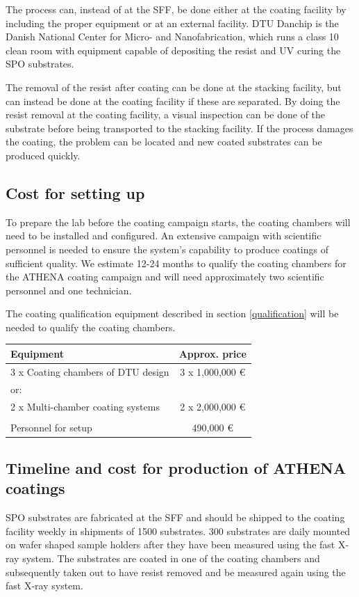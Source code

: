 The process can, instead of at the SFF, be done either at the coating facility by including the proper equipment or at an external facility. DTU Danchip is the Danish National Center for Micro- and Nanofabrication, which runs a class 10 clean room with equipment capable of depositing the resist and UV curing the SPO substrates.

The removal of the resist after coating can be done at the stacking facility, but can instead be done at the coating facility if these are separated. By doing the resist removal at the coating facility, a visual inspection can be done of the substrate before being transported to the stacking facility. If the process damages the coating, the problem can be located and new coated substrates can be produced quickly.


\subsection{Cost for setting up}
To prepare the lab before the coating campaign starts, the coating chambers will need to be installed and configured. An extensive campaign with scientific personnel is needed to ensure the system's capability to produce coatings of sufficient quality. We estimate 12-24 months to qualify the coating chambers for the ATHENA coating campaign and will need approximately two scientific personnel and one technician.

The coating qualification equipment described in section \ref{qualification} will be needed to qualify the coating chambers.


\begin{table}[htbp]
	\centering
\begin{tabular}{l|c}
Equipment & Approx. price \\
\hline
\hline
3 x Coating chambers of DTU design  & 3 x 1,000,000 \euro\\
\hline
or:\\
\hline
2 x Multi-chamber coating systems & 2 x 2,000,000 \euro \\
\hline
\\
\hline
Personnel for setup & 490,000 \euro\\
\end{tabular}
\end{table}


\subsection{Timeline and cost for production of ATHENA coatings}
SPO substrates are fabricated at the SFF and should be shipped to the coating facility weekly in shipments of 1500 substrates. 300 substrates are daily mounted on wafer shaped sample holders after they have been measured using the fast X-ray system. The substrates are coated in one of the coating chambers and subsequently taken out to have resist removed and be measured again using the fast X-ray system.

